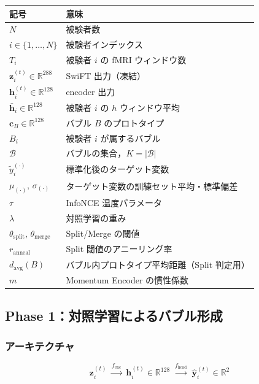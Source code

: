 \documentclass[12pt, a4paper]{ltjsarticle}
\begin{document}
\begin{table}[h]
\centering
\begin{tabular}{ll}
  \toprule
  記号 & 意味 \\
  \midrule
  $N$ & 被験者数 \\
  $i \in \{1,\ldots,N\}$ & 被験者インデックス \\
  $T_i$ & 被験者 $i$ の fMRI ウィンドウ数 \\
  $\bm{z}_i^{(t)} \in \mathbb{R}^{288}$ & SwiFT 出力（凍結） \\
  $\bm{h}_i^{(t)} \in \mathbb{R}^{128}$ & encoder 出力 \\
  $\bar{\bm{h}}_i \in \mathbb{R}^{128}$ & 被験者 $i$ の $h$ ウィンドウ平均 \\
  $\bm{c}_B \in \mathbb{R}^{128}$ & バブル $B$ のプロトタイプ \\
  $B_i$ & 被験者 $i$ が属するバブル \\
  $\mathcal{B}$ & バブルの集合，$K = |\mathcal{B}|$ \\
  $\tilde{y}^{(\cdot)}_i$ & 標準化後のターゲット変数 \\
  $\mu_{(\cdot)},\,\sigma_{(\cdot)}$ & ターゲット変数の訓練セット平均・標準偏差 \\
  $\tau$ & InfoNCE 温度パラメータ \\
  $\lambda$ & 対照学習の重み \\
  $\theta_{\text{split}},\,\theta_{\text{merge}}$ & Split/Merge の閾値 \\
  $r_{\text{anneal}}$ & Split 閾値のアニーリング率 \\
  $d_{\text{avg}}(B)$ & バブル内プロトタイプ平均距離（Split 判定用） \\
  $m$ & Momentum Encoder の慣性係数 \\
  \bottomrule
\end{tabular}
\end{table}

\subsection{Phase 1：対照学習によるバブル形成}

\subsubsection*{アーキテクチャ}

\begin{equation}
  \bm{z}_i^{(t)}
  \;\xrightarrow{f_{\text{enc}}}\;
  \bm{h}_i^{(t)} \in \mathbb{R}^{128}
  \;\xrightarrow{f_{\text{head}}}\;
  \hat{\bm{y}}_i^{(t)} \in \mathbb{R}^2
  \label{eq:p1arch}
\end{equation}
\end{document}
